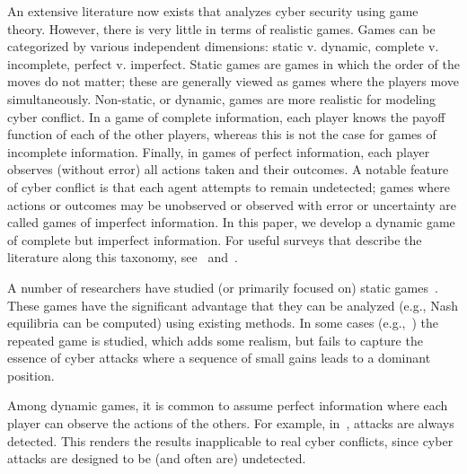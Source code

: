 An extensive literature now exists that analyzes cyber security using
game theory. However, there is very little in terms of realistic
games. Games can be categorized by various independent dimensions:
static v. dynamic, complete v. incomplete, perfect
v. imperfect. Static games are games in which the order of the moves
do not matter; these are generally viewed as games where the players
move simultaneously. Non-static, or dynamic, games are more realistic
for modeling cyber conflict. In a game of complete information, each
player knows the payoff function of each of the other players, whereas
this is not the case for games of incomplete information. Finally, in
games of perfect information, each player observes (without error) all
actions taken and their outcomes. A notable feature of cyber conflict
is that each agent attempts to remain undetected; games where actions
or outcomes may be unobserved or observed with error or uncertainty
are called games of imperfect information. In this paper, we develop a
dynamic game of complete but imperfect information. For useful surveys
that describe the literature along this taxonomy,
see~\cite{liang2013game} and~\cite{roy2010survey}.


A number of researchers have studied (or primarily focused on) static
games~\cite{grossklags2009uncertainty,he2012game,chen2009game,liu2006bayesian}. These
games have the significant advantage that they can be analyzed (e.g.,
Nash equilibria can be computed) using existing methods. In some cases
(e.g.,~\cite{nguyen2009security}) the repeated game is studied, which
adds some realism, but fails to capture the essence of cyber attacks
where a sequence of small gains leads to a dominant position.


Among dynamic games, it is common to assume perfect information where
each player can observe the actions of the others. For example,
in~\cite{patcha2004game, nguyen2009security, luo2010game,
  sagduyu2011jamming, shamma2005dynamic}, attacks are always
detected. This renders the results inapplicable to real cyber
conflicts, since cyber attacks are designed to be (and often are)
undetected.


